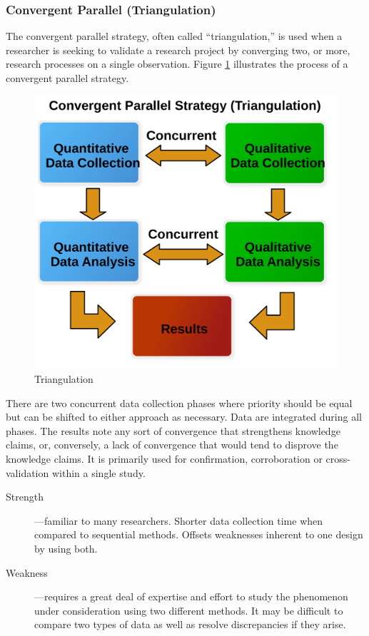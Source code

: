 \subsubsection{Convergent Parallel (Triangulation)}

The convergent parallel strategy, often called ``triangulation,'' is used when a researcher is seeking to validate a research project by converging two, or more, research processes on a single observation. Figure \ref{14:fig92} illustrates the process of a convergent parallel strategy. 

\begin{figure}[H]
	\centering
	\includegraphics[width=\maxwidth{.95\linewidth}]{gfx/14-Triangulation}
	\caption{Triangulation}
	\label{14:fig92}
\end{figure}

There are two concurrent data collection phases where priority should be equal but can be shifted to either approach as necessary. Data are integrated during all phases. The results note any sort of convergence that strengthens knowledge claims, or, conversely, a lack of convergence that would tend to disprove the knowledge claims. It is primarily used for confirmation, corroboration or cross-validation within a single study.

\begin{description}
	\item[Strength]---familiar to many researchers. Shorter data collection time when compared to sequential methods. Offsets weaknesses inherent to one design by using both.
	\item[Weakness]---requires a great deal of expertise and effort to study the phenomenon under consideration using two different methods. It may be difficult to compare two types of data as well as resolve discrepancies if they arise.
\end{description}

